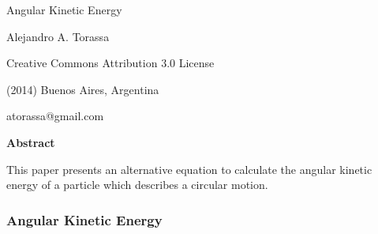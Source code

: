 \documentclass[10pt]{article}
\begin{document}
\begin{center}

{\LARGE Angular Kinetic Energy}

\bigskip \medskip

Alejandro A. Torassa

\bigskip \medskip

\footnotesize

Creative Commons Attribution 3.0 License

(2014) Buenos Aires, Argentina

atorassa@gmail.com

\bigskip \smallskip

\small

{\bf Abstract}

\bigskip

\parbox{87.3mm}{This paper presents an alternative equation to calculate the angular kinetic energy of a particle which describes a circular motion.}

\end{center}

\normalsize

\vspace{-0.60em}

{\centering\subsubsection*{Angular Kinetic Energy}}

\vspace{+0.60em}
\end{document}
